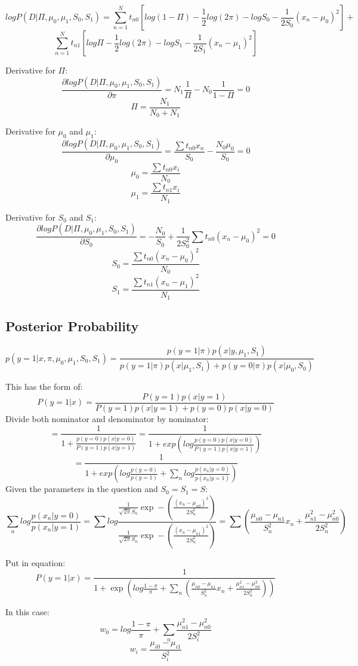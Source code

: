 \documentclass[letter,11pt]{article}
\begin{document}
	$$logP(D|\Pi,\mu_0,\mu_1,S_0,S_1) = \sum_{n=1}^{N}t_{n0}[log(1-\Pi)-\frac{1}{2}log(2\pi) - logS_0 - \frac{1}{2S_0}(x_n-\mu_0)^2] +$$ $$\sum_{n=1}^{N}t_{n1}[log\Pi - \frac{1}{2}log(2\pi)-logS_1 - \frac{1}{2S_1}(x_n-\mu_1)^2]$$
	
	Derivative for $\Pi$:
	$$\frac{\partial logP(D|\Pi,\mu_0,\mu_1,S_0,S_1)}{\partial\pi} = N_1\frac{1}{\Pi} - N_0\frac{1}{1-\Pi} = 0$$
	$$\Pi = \frac{N_1}{N_0 + N_1}$$
	
	Derivative for $\mu_0$ and $\mu_1$:
	$$\frac{\partial logP(D|\Pi,\mu_0,\mu_1,S_0,S_1)}{\partial\mu_0} = \frac{\sum t_{n0}x_n}{S_0} - \frac{N_0\mu_0}{S_0} = 0$$
	$$\mu_0 = \frac{\sum t_{n0}x_i}{N_0}$$
	$$\mu_1 = \frac{\sum t_{n1}x_i}{N_1}$$
	
	Derivative for $S_0$ and $S_1$:
	$$\frac{\partial logP(D|\Pi,\mu_0,\mu_1,S_0,S_1)}{\partial S_0} = -\frac{N_0}{S_0} + \frac{1}{2S_0^2}\sum t_{n0}(x_n-\mu_0)^2 = 0$$
	$$S_0 = \frac{\sum t_{n0}(x_n-\mu_0)^2}{N_0}$$
	$$S_1 = \frac{\sum t_{n1}(x_n-\mu_1)^2}{N_1}$$	
	
	\subsection{Posterior Probability}
	
	$$p(y = 1|x,\pi,\mu_0,\mu_1,S_0,S_1) = \frac{p(y=1|\pi)p(x|y,\mu_1,S_1)}{p(y=1|\pi)p(x|\mu_1,S_1)+p(y=0|\pi)p(x|\mu_0,S_0)}$$
	
	This has the form of:
	$$P(y = 1|x) = \frac{P(y=1)p(x|y=1)}{P(y=1)p(x|y=1)+p(y=0)p(x|y=0)}$$
	Divide both nominator and denominator by nominator:
	$$ = \frac{1}{1 + \frac{p(y=0)p(x|y=0)}{P(y=1)p(x|y=1)}} = \frac{1}{1 + exp(log \frac{p(y=0)p(x|y=0)}{P(y=1)p(x|y=1)})}$$
	$$ = \frac{1}{1 + exp(log \frac{p(y=0)}{p(y=1)}+ \sum_{n}log\frac{p(x_n|y=0)}{p(x_n|y=1)})}$$
	Given the parameters in the question and $S_0 = S_1 = S $:
	$$\sum_{n}log\frac{p(x_n|y=0)}{p(x_n|y=1)} = \sum log \frac{\frac{1}{\sqrt{2\pi}S_n}\exp-(\frac{(x_n - \mu_{n0})^2}{2S_n^2})}{\frac{1}{\sqrt{2\pi}S_n}\exp -(\frac{(x_n - \mu_{n1})^2}{2S_n^2})} = \sum (\frac{\mu_{n0}-\mu_{n1}}{S_n^2}x_n + \frac{\mu_{n1}^2-\mu_{n0}^2}{2S_n^2})$$
	
	Put in equation:
	$$P(y = 1|x) = \frac{1}{1 + \exp(log\frac{1-\pi}{\pi} + \sum_{n}(\frac{\mu_{n0}-\mu_{n1}}{S_n^2}x_n + \frac{\mu_{n1}^2-\mu_{n0}^2}{2S_n^2}))}$$
	
	In this case:
	$$w_0 = log \frac{1-\pi}{\pi} + \sum_{n}\frac{\mu_{n1}^2 - \mu_{n0}^2}{2S_i^2}$$
	$$w_i = \frac{\mu_{i0} - \mu_{i1}}{S_i^2}$$
	
\end{document}
